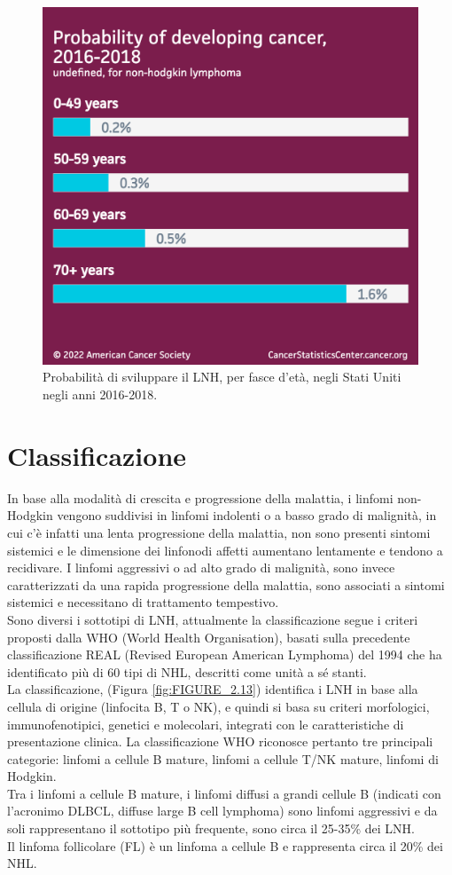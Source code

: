 \begin{figure}[H]
    \begin{center}
    \includegraphics[width=0.4\columnwidth]{img/Probabilityofdevelopingcancer.png}
    \vspace{-3mm}
    \end{center}
    \caption{Probabilità di sviluppare il LNH, per fasce d’età, negli Stati Uniti negli anni 2016-2018.
    \cite{Americanstatistic}}

\end{figure}

\section{Classificazione}
In base alla modalità di crescita e progressione della malattia, i linfomi non-Hodgkin vengono suddivisi in 
linfomi indolenti o a basso grado di malignità, in cui c’è infatti una lenta progressione della malattia, 
non sono presenti sintomi sistemici e le dimensione dei linfonodi affetti aumentano lentamente e tendono a recidivare. 
I linfomi aggressivi o ad alto grado di malignità, sono invece caratterizzati da una rapida progressione della malattia, 
sono associati a sintomi sistemici e necessitano di trattamento tempestivo\cite{reteveneta}.\\

Sono diversi i sottotipi di LNH, attualmente la classificazione segue i criteri proposti dalla WHO 
(World Health Organisation), basati sulla precedente classificazione REAL (Revised European American Lymphoma) 
del 1994 che ha identificato più di 60 tipi di NHL, descritti come unità a sé stanti\cite{AIOM}.\\
La classificazione, (Figura \ref{fig:FIGURE_2.13}) identifica i LNH in base alla cellula di origine 
(linfocita B, T o NK), e quindi si basa su criteri morfologici, immunofenotipici, genetici e molecolari, 
integrati con le caratteristiche di presentazione clinica. 
La classificazione WHO riconosce pertanto tre principali categorie: linfomi a cellule B mature, linfomi a cellule T/NK
mature, linfomi di Hodgkin\cite{AIOM}.\\
Tra i linfomi a cellule B mature, i linfomi diffusi a grandi cellule B (indicati con l’acronimo DLBCL, 
diffuse large B cell lymphoma) sono linfomi aggressivi e da soli rappresentano il sottotipo più frequente, 
sono circa il 25-35\% dei LNH\cite{AIOM}.\\
Il linfoma follicolare (FL) è un linfoma a cellule B e rappresenta circa il 20\% dei NHL.\\

